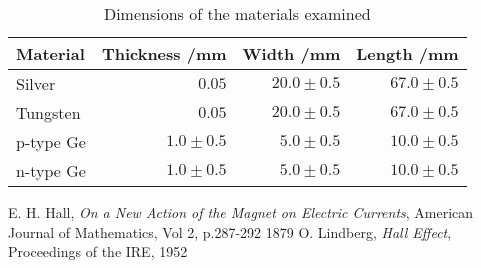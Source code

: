 \documentclass{article}
\begin{document}
	\begin{table}[h!]
		\begin{center}
			\begin{tabular}{|l|r|r|r|} 
			\hline
			Material  & Thickness /mm & Width /mm    & Length /mm   \\ \hline
			Silver    & $0.05$        & $20.0\pm0.5$ & $67.0\pm0.5$ \\
			Tungsten  & $0.05$        & $20.0\pm0.5$ & $67.0\pm0.5$ \\
			p-type Ge & $1.0\pm0.5$   & $5.0\pm0.5$      & $10.0\pm0.5$ \\
			n-type Ge & $1.0\pm0.5$   & $5.0\pm0.5$      & $10.0\pm0.5$ \\ \hline	
			\end{tabular}
		\end{center}
		\caption{Dimensions of the materials examined}
		\label{table:dimensions}
	\end{table}
	
	\newpage
	\begin{thebibliography}{9}
			E. H. Hall,
			\emph{On a New Action of the Magnet on Electric Currents},
			American Journal of Mathematics, Vol 2, p.287-292
			1879
			O. Lindberg,
			\emph{Hall Effect},
			Proceedings of the IRE,
			1952
	\end{thebibliography}
\end{document}
